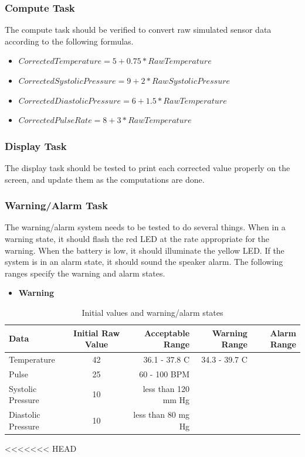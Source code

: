 \documentclass[12pt]{article} %
\begin{document}
\subsubsection{Compute Task}
The compute task should be verified to convert raw simulated sensor data according to the following formulas.
\begin{itemize}
  \item $CorrectedTemperature = 5 + 0.75 * RawTemperature$
  \item $CorrectedSystolicPressure = 9 + 2 * RawSystolicPressure$
  \item $CorrectedDiastolicPressure = 6 + 1.5 * RawTemperature$
  \item $CorrectedPulseRate = 8 + 3 * RawTemperature$
\end{itemize}

\subsubsection{Display Task}
The display task should be tested to print each corrected value properly on the screen, and update them as the computations are done.

\subsubsection{Warning/Alarm Task} The warning/alarm system needs to be tested
to do several things.  When in a warning state, it should flash the red LED at
the rate appropriate for the warning.  When the battery is low, it should
illuminate the yellow LED.  If the system is in an alarm state, it should sound
the speaker alarm.  The following ranges specify the warning and alarm states.
\begin{itemize} \item \textbf{Warning}
  \end{itemize}

\begin{table}[h]
	\centering
	\begin{tabular}{lcrrr} 
    \toprule
		Data & Initial Raw Value & Acceptable Range & Warning Range & Alarm Range \\
		\midrule
		Temperature & 42 & 36.1 - 37.8 C & 34.3 - 39.7 C& \\
		Pulse & 25 & 60 - 100 BPM & & \\
		Systolic Pressure  & 10 & less than 120 mm Hg & & \\
		Diastolic Pressure & 10 & less than 80 mg Hg & & \\
    \bottomrule
	\end{tabular}
<<<<<<< HEAD
	\caption{Initial values and warning/alarm states}
  \label{tab:ranges}
\end{table}
\end{document}
